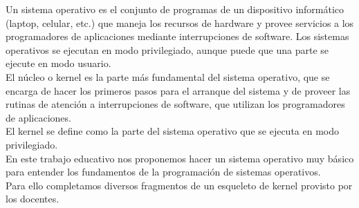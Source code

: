 Un sistema operativo es el conjunto de programas de un dispositivo informático (laptop, celular, etc.) que maneja los recursos de hardware y provee servicios a los programadores de aplicaciones mediante interrupciones de software. Los sistemas operativos se ejecutan en modo privilegiado, aunque puede que una parte se ejecute en modo usuario.\\
El núcleo o kernel es la parte más fundamental del sistema operativo, que se encarga de hacer los primeros pasos para el arranque del sistema y de proveer las rutinas de atención a interrupciones de software, que utilizan los programadores de aplicaciones.\\
El kernel se define como la parte del sistema operativo que se ejecuta en modo privilegiado.\\
En este trabajo educativo nos proponemos hacer un sistema operativo muy básico para entender los fundamentos de la programación de sistemas operativos.\\
Para ello completamos diversos fragmentos de un esqueleto de kernel provisto por los docentes. 
